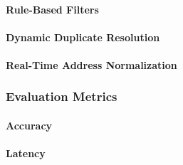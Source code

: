         \paragraph{Rule-Based Filters}
        \paragraph{Dynamic Duplicate Resolution}
        \paragraph{Real-Time Address Normalization}
    
    \subsubsection{Evaluation Metrics}
        \paragraph{Accuracy}
        \paragraph{Latency}

\blankLine